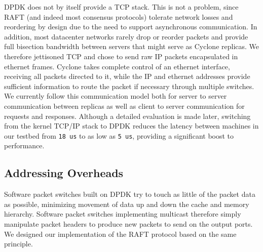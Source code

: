 \documentclass[letterpaper,twocolumn,10pt]{article}
\begin{document}
DPDK does not by itself provide a TCP stack. This is not a problem, since
RAFT (and indeed most consensus protocols) tolerate network losses and
reordering by design due to the need to support asynchronous communication. In
addition, most datacenter networks rarely drop or reorder packets and provide
full bisection bandwidth between servers that might serve as Cyclone replicas. We
therefore jettisoned TCP and chose to send raw IP packets encapsulated in
ethernet frames. Cyclone takes complete control of an ethernet interface,
receiving all packets directed to it, while the IP and ethernet addresses
provide sufficient information to route the packet if necessary through multiple
switches. We currently follow this communication model both for server to server
communication between replicas as well as client to server communication for
requests and responses. Although a detailed evaluation is made later, switching
from the kernel TCP/IP stack to DPDK reduces the latency between machines in our
testbed from {\tt 18 us} to as low as {\tt 5 us}, providing a significant boost
to performance.

\subsection{Addressing Overheads}
\label{sec:dm}
Software packet switches built on DPDK try to touch as little of the packet data
as possible, minimizing movement of data up and down the cache and memory
hierarchy. Software packet switches implementing multicast therefore
simply manipulate packet headers to produce new packets to send on the output
ports. We designed our implementation of the RAFT protocol based on the same
principle.
\end{document}
